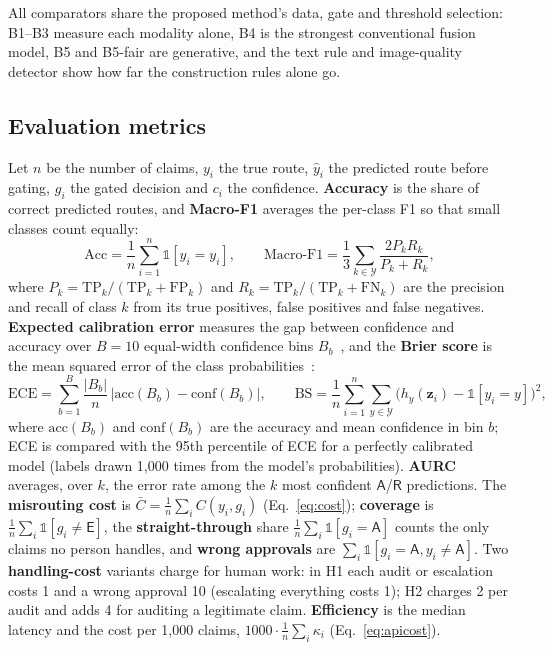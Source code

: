 All comparators share the proposed method's data, gate and threshold selection: B1--B3 measure each modality alone, B4 is the strongest conventional fusion model, B5 and B5-fair are generative, and the text rule and image-quality detector show how far the construction rules alone go.

\subsection{Evaluation metrics}\label{sec:metrics}

Let $n$ be the number of claims, $y_i$ the true route, $\hat{y}_i$ the predicted route before gating, $g_i$ the gated decision and $c_i$ the confidence. \textbf{Accuracy} is the share of correct predicted routes, and \textbf{Macro-F1} averages the per-class F1 so that small classes count equally:
\begin{equation}
\mathrm{Acc}=\frac{1}{n}\sum_{i=1}^{n}\mathbb{1}[\hat{y}_i=y_i],\qquad \text{Macro-F1}=\frac{1}{3}\sum_{k\in\mathcal{Y}}\frac{2P_kR_k}{P_k+R_k},
\end{equation}
where $P_k=\mathrm{TP}_k/(\mathrm{TP}_k+\mathrm{FP}_k)$ and $R_k=\mathrm{TP}_k/(\mathrm{TP}_k+\mathrm{FN}_k)$ are the precision and recall of class $k$ from its true positives, false positives and false negatives. \textbf{Expected calibration error} measures the gap between confidence and accuracy over $B=10$ equal-width confidence bins $B_b$~\cite{naeini2015,guo2017calibration}, and the \textbf{Brier score} is the mean squared error of the class probabilities~\cite{brier1950}:
\begin{equation}
\mathrm{ECE}=\sum_{b=1}^{B}\frac{|B_b|}{n}\,\big|\mathrm{acc}(B_b)-\mathrm{conf}(B_b)\big|,\qquad \mathrm{BS}=\frac{1}{n}\sum_{i=1}^{n}\sum_{y\in\mathcal{Y}}\big(h_y(\mathbf{z}_i)-\mathbb{1}[y_i=y]\big)^2,
\end{equation}
where $\mathrm{acc}(B_b)$ and $\mathrm{conf}(B_b)$ are the accuracy and mean confidence in bin $b$; ECE is compared with the 95th percentile of ECE for a perfectly calibrated model (labels drawn 1,000 times from the model's probabilities). \textbf{AURC}~\cite{geifman2017selective} averages, over $k$, the error rate among the $k$ most confident $\mathsf{A}$/$\mathsf{R}$ predictions. The \textbf{misrouting cost} is $\bar{C}=\frac{1}{n}\sum_i C(y_i,g_i)$ (Eq.~\ref{eq:cost}); \textbf{coverage} is $\frac{1}{n}\sum_i\mathbb{1}[g_i\neq\mathsf{E}]$, the \textbf{straight-through} share $\frac{1}{n}\sum_i\mathbb{1}[g_i=\mathsf{A}]$ counts the only claims no person handles, and \textbf{wrong approvals} are $\sum_i\mathbb{1}[g_i=\mathsf{A},y_i\neq\mathsf{A}]$. Two \textbf{handling-cost} variants charge for human work: in H1 each audit or escalation costs 1 and a wrong approval 10 (escalating everything costs 1); H2 charges 2 per audit and adds 4 for auditing a legitimate claim. \textbf{Efficiency} is the median latency and the cost per 1,000 claims, $1000\cdot\frac{1}{n}\sum_i\kappa_i$ (Eq.~\ref{eq:apicost}).


